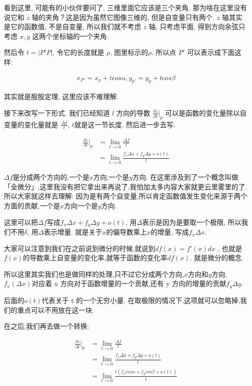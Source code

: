 看到这里, 可能有的小伙伴要问了, 三维里面它应该是三个夹角, 那为啥在这里没有说它和 $z$ 轴的夹角？这是因为虽然它图像三维的, 但是自变量只有两个. $z$ 轴其实是它的函数值, 不是自变量, 所以我们就不考虑 $z$ 轴, 只考虑平面, 得到方向余弦只考虑 $x, y$ 这两个坐标轴的一个夹角. 

然后令 $t = |P'P|$, 令它的长度就是 $\rho$, 图里标示的$\rho$. 所以点 $P'$ 可以表示成下面这样: 

\begin{align*}
  x_{P'} = x_p + t cos \alpha, y_{p'} = y_p + t cos \beta
\end{align*}

其实就是股股定理, 这里应该不难理解. 

接下来改写一下形式, 我们已经知道 $l$ 方向的导数 $\frac{\partial z}{\partial l} \Bigg \vert _p$ 可以是函数的变化量除以自变量的变化量就是 $\frac{\Delta f}{t}$, $t$就是这一节长度. 然后进一步去写:

\begin{align*}
  \frac{\partial z}{\partial l} \Bigg \vert _p & = \lim_{t \to 0}\frac{\Delta f}{t} \\
  & = \lim_{t \to 0} \frac{f_x\Delta x + f_y \Delta y + o(t)}{t}
\end{align*}

$\Delta f$是分成两个方向的,一个是$x$方向,一个是$y$方向. 在这里涉及到了一个概念叫做「全微分」,这里我没有把它拿出来再说了,我怕加太多内容大家就更云里雾里的了. 所以大家就这样去理解: 因为是有两个自变量,所以肯定函数值发生变化来源于两个方面的贡献,一个是$x$方向一个是$y$方向. 

这里可以把$\Delta f$写成$f_x\Delta x + f_y \Delta y + o(t)$, 用$\Delta$表示是因为是要取一个极限, 所以我们不用$\delta$, 用$\Delta$表示增量. 就是关于$x$的偏导数乘上$x$的增量, 写成$f_x\Delta x$. 

大家可以注意到我们在之前说到微分的时候,就说到$df(x) = f'(x)dx$ , 也就是$f(x)$的导数乘上自变量的变化率,就等于函数的变化率$df(x)$. 就是微分的概念. 

所以这里其实我们也是做同样的处理,只不过它分成两个方向,$x$方向和$y$方向. $f_x(\Delta x)$对应着 x 方向对于函数增量的一个贡献,还有 y 方向的增量的贡献$f_y \Delta y$.  

后面的$o(t)$代表关于 t 的一个无穷小量. 在取极限的情况下,这项就可以忽略掉,我们的重点可以不用放在这一块. 

在之后,我们再去做一个转换:

\begin{align*}
  \frac{\partial z}{\partial l} \Bigg \vert _p & = \lim_{t \to 0}\frac{\Delta f}{t} \\
  & = \lim_{t \to 0} \frac{f_x\Delta x + f_y \Delta y + o(t)}{t} \\
  & = \lim_{t \to 0} \frac{t(f_xcos \alpha + f_y cos\beta + o(t))}{t} 
\end{align*}

